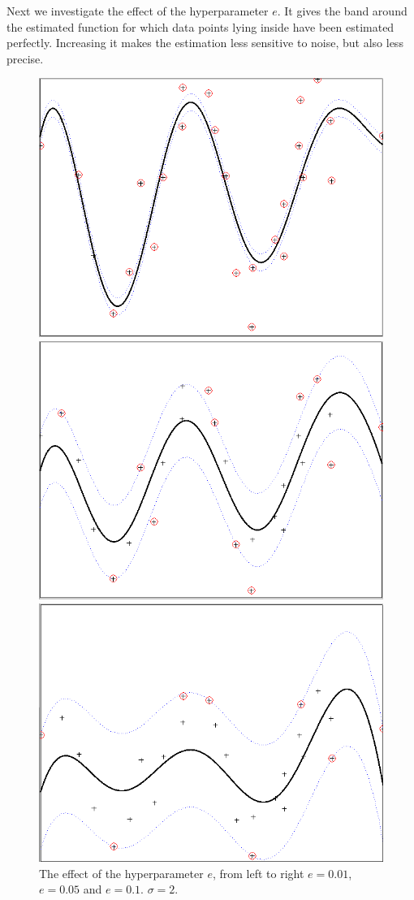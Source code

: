 \documentclass[•]{article}
\begin{document}
Next we investigate the effect of the hyperparameter $e$. It gives the band around the estimated function for which data points lying inside have been estimated perfectly. Increasing it makes the estimation less sensitive to noise, but also less precise. 

\begin{figure}[H]
\centering
\begin{minipage}{.3\textwidth}
\includegraphics[width=.8\textwidth]{e01.png}
\end{minipage}
\begin{minipage}{.3\textwidth}
\includegraphics[width=.8\textwidth]{e25.png}
\end{minipage}
\begin{minipage}{.3\textwidth}
\includegraphics[width=.8\textwidth]{e1.png}
\end{minipage}
\caption{The effect of the hyperparameter $e$, from left to right $e=0.01$, $e=0.05$ and $e=0.1$. $\sigma = 2$.}
\end{figure}
\end{document}
